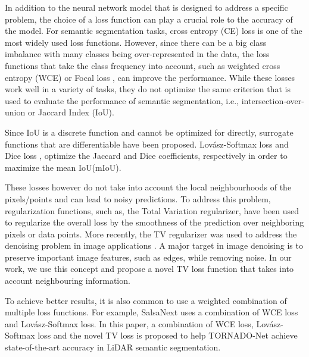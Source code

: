 \documentclass{article}
\begin{document}
In addition to the neural network model that is designed to address a specific problem, the choice of a loss function can play a crucial role to the accuracy of the model. For semantic segmentation tasks, cross entropy (CE) loss is one of the most widely used loss functions. However, since there can be a big class imbalance with many classes being over-represented in the data, the loss functions that take the class frequency into account, such as weighted cross entropy (WCE) or Focal loss \cite{lin2017focal}, can improve the performance. While these losses work well in a variety of tasks, they do not optimize the same criterion that is used to evaluate the performance of semantic segmentation, i.e., intersection-over-union or Jaccard Index (IoU). 

Since IoU is a discrete function and cannot be optimized for directly, surrogate functions that are differentiable have been proposed. Lov\'asz-Softmax loss \cite{berman2018lovasz} and Dice loss \cite{triess2020scanbased}, optimize the Jaccard and Dice coefficients, respectively in order to maximize the mean IoU(mIoU).

These losses however do not take into account the local neighbourhoods of the pixels/points and can lead to noisy predictions. To address this problem, regularization functions, such as, the Total Variation regularizer, have been used to regularize the overall loss by the smoothness of the prediction over neighboring pixels or data points. More recently, the TV regularizer was used to address the denoising problem in image applications \cite{chan2005recent, chen2010adaptive}. A major target in image denoising is to preserve important image features, such as edges, while removing noise. In our work, we use this concept and propose a novel TV loss function that takes into account neighbouring information.

To achieve better results, it is also common to use a weighted combination of multiple loss functions. For example, SalsaNext \cite{aksoy2019salsanet} uses a combination of WCE loss and Lov\'asz-Softmax loss. In this paper, a combination of WCE loss,  Lov\'asz-Softmax loss and the novel TV loss is proposed to help TORNADO-Net achieve state-of-the-art accuracy in LiDAR semantic segmentation.
\end{document}
